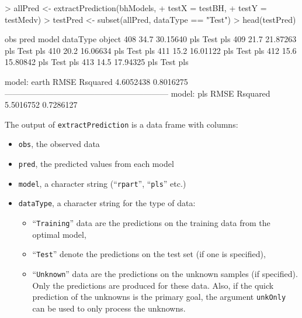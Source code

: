 \documentclass[12pt]{article}
\begin{document}
\begin{small}
\begin{Schunk}
\begin{Sinput}
> allPred <- extractPrediction(bhModels,
+                              testX = testBH,
+                              testY = testMedv)
> testPred <- subset(allPred, dataType == "Test")
> head(testPred)
\end{Sinput}
\begin{Soutput}
     obs     pred model dataType object
408 34.7 30.15640   pls     Test    pls
409 21.7 21.87263   pls     Test    pls
410 20.2 16.06634   pls     Test    pls
411 15.2 16.01122   pls     Test    pls
412 15.6 15.80842   pls     Test    pls
413 14.5 17.94325   pls     Test    pls
\end{Soutput}
\begin{Soutput}
model: earth
     RMSE  Rsquared 
4.6052438 0.8016275 
------------------------------------------------------------ 
model: pls
     RMSE  Rsquared 
5.5016752 0.7286127 
\end{Soutput}
\end{Schunk}
\end{small}
The output of \texttt{extractPrediction} is a data frame with columns:
   \begin{itemize}   
      \item \texttt{obs}, the observed data
      \item \texttt{pred}, the predicted values from each model
      \item \texttt{model}, a character string (``\texttt{rpart}'', ``\texttt{pls}'' etc.)
      \item \texttt{dataType}, a character string for the type of data:
      \begin{itemize}
         \item ``\texttt{Training}'' data are the predictions on the training data from
            the optimal model,
         \item ``\texttt{Test}'' denote the predictions on the test set (if one is specified),
         \item ``\texttt{Unknown}'' data are the predictions on the unknown samples (if specified). 
         Only the predictions are produced for these data. Also, if the quick prediction of the unknowns
         is the primary goal, the argument \texttt{unkOnly} can be used to only process the unknowns.
      \end{itemize}
   \end{itemize}      
\end{document}

